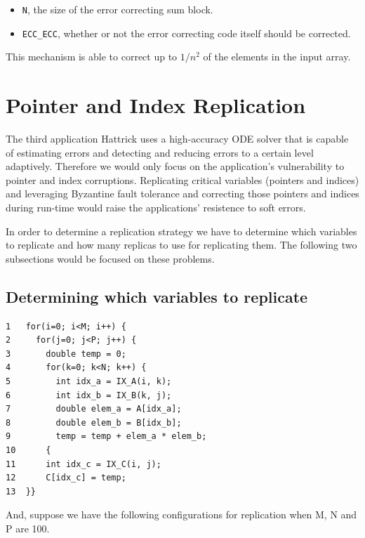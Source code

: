 \documentclass{article}
\begin{document}
\begin{itemize}
\item{\texttt{N}, the size of the error correcting sum block.}
\item{\texttt{ECC\_ECC}, whether or not the error correcting code itself should be corrected.}
\end{itemize}

This mechanism is able to correct up to $1/{n^2}$ of the elements in the input array.

\section{Pointer and Index Replication}

The third application Hattrick uses a high-accuracy ODE solver that is capable of estimating errors and detecting and reducing errors to a certain level adaptively. Therefore we would only focus on the application's vulnerability to pointer and index corruptions. Replicating critical variables (pointers and indices) and leveraging Byzantine fault tolerance and correcting those pointers and indices during run-time would raise the applications' resistence to soft errors.

In order to determine a replication strategy we have to determine which variables to replicate and how many replicas to use for replicating them. The following two subsections would be focused on these problems.

\subsection{Determining which variables to replicate}

\begin{center}
\begin{verbatim}
1   for(i=0; i<M; i++) {
2     for(j=0; j<P; j++) {
3       double temp = 0;
4       for(k=0; k<N; k++) {
5         int idx_a = IX_A(i, k);
6         int idx_b = IX_B(k, j);
7         double elem_a = A[idx_a];
8         double elem_b = B[idx_b];
9         temp = temp + elem_a * elem_b;
10      {
11      int idx_c = IX_C(i, j);
12      C[idx_c] = temp;
13  }}
\end{verbatim}
\end{center}

And, suppose we have the following configurations for replication when M, N and P are 100.
\end{document}
